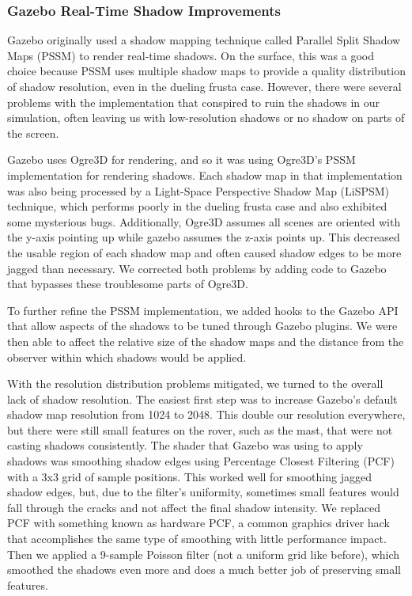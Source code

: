 \documentclass[twocolumn,letterpaper]{IEEEAerospaceCLS}  %
\begin{document}
\subsubsection{Gazebo Real-Time Shadow Improvements}
Gazebo originally used a shadow mapping technique called Parallel Split Shadow Maps (PSSM) to render real-time shadows. 
On the surface, this was a good choice because PSSM uses multiple shadow maps to provide a quality distribution of shadow resolution, even in the dueling frusta case. 
However, there were several problems with the implementation that conspired to ruin the shadows in our simulation, often leaving us with low-resolution shadows or no shadow on parts of the screen.

Gazebo uses Ogre3D for rendering, and so it was using Ogre3D's PSSM implementation for rendering shadows. 
Each shadow map in that implementation was also being processed by a Light-Space Perspective Shadow Map (LiSPSM) technique, which performs poorly in the dueling frusta case and also exhibited some mysterious bugs. 
Additionally, Ogre3D assumes all scenes are oriented with the y-axis pointing up while gazebo assumes the z-axis points up. 
This decreased the usable region of each shadow map and often caused shadow edges to be more jagged than necessary. 
We corrected both problems by adding code to Gazebo that bypasses these troublesome parts of Ogre3D.

To further refine the PSSM implementation, we added hooks to the Gazebo API that allow aspects of the shadows to be tuned through Gazebo plugins. 
We were then able to affect the relative size of the shadow maps and the distance from the observer within which shadows would be applied.

With the resolution distribution problems mitigated, we turned to the overall lack of shadow resolution. 
The easiest first step was to increase Gazebo's default shadow map resolution from 1024 to 2048. 
This double our resolution everywhere, but there were still small features on the rover, such as the mast, that were not casting shadows consistently. 
The shader that Gazebo was using to apply shadows was smoothing shadow edges using Percentage Closest Filtering (PCF) with a 3x3 grid of sample positions. 
This worked well for smoothing jagged shadow edges, but, due to the filter's uniformity, sometimes small features would fall through the cracks and not affect the final shadow intensity. 
We replaced PCF with something known as hardware PCF, a common graphics driver hack that accomplishes the same type of smoothing with little performance impact. 
Then we applied a 9-sample Poisson filter (not a uniform grid like before), which smoothed the shadows even more and does a much better job of preserving small features.
\end{document}
